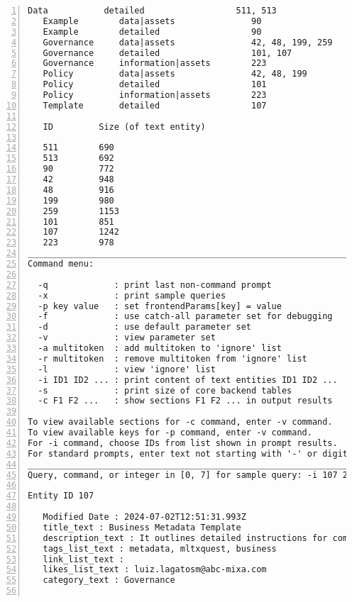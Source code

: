 \documentclass[10pt]{article}
\begin{document}
{\begin{lstlisting}[numbers=left,basicstyle=\ttfamily\footnotesize, frame=none]
   Data           detailed                  511, 513
   Example        data|assets               90
   Example        detailed                  90
   Governance     data|assets               42, 48, 199, 259
   Governance     detailed                  101, 107
   Governance     information|assets        223
   Policy         data|assets               42, 48, 199
   Policy         detailed                  101
   Policy         information|assets        223
   Template       detailed                  107

   ID         Size (of text entity)

   511        690
   513        692
   90         772
   42         948
   48         916
   199        980
   259        1153
   101        851
   107        1242
   223        978
____________________________________________________________________
Command menu:

  -q             : print last non-command prompt
  -x             : print sample queries
  -p key value   : set frontendParams[key] = value
  -f             : use catch-all parameter set for debugging
  -d             : use default parameter set
  -v             : view parameter set
  -a multitoken  : add multitoken to 'ignore' list
  -r multitoken  : remove multitoken from 'ignore' list
  -l             : view 'ignore' list
  -i ID1 ID2 ... : print content of text entities ID1 ID2 ...
  -s             : print size of core backend tables
  -c F1 F2 ...   : show sections F1 F2 ... in output results

To view available sections for -c command, enter -v command.
To view available keys for -p command, enter -v command.
For -i command, choose IDs from list shown in prompt results.
For standard prompts, enter text not starting with '-' or digit.
____________________________________________________________________
Query, command, or integer in [0, 7] for sample query: -i 107 259

Entity ID 107

   Modified Date : 2024-07-02T12:51:31.993Z
   title_text : Business Metadata Template
   description_text : It outlines detailed instructions for completing the template accurately, covering various sections such as data dictionary, data source, sensitivity information, and roles. After filling out the template, users can interpret the entered data, ensuring clarity on sensitivity classifications, business details, and key roles. Once completed and reviewed, the metadata is uploaded to MLTxQuest, making it accessible through the MLTxQuest portal for all authorized users, thereby centralizing and simplifying access to critical information within the organization.
   tags_list_text : metadata, mltxquest, business
   link_list_text :
   likes_list_text : luiz.lagatosm@abc-mixa.com
   category_text : Governance


\end{lstlisting}}
\end{document}
